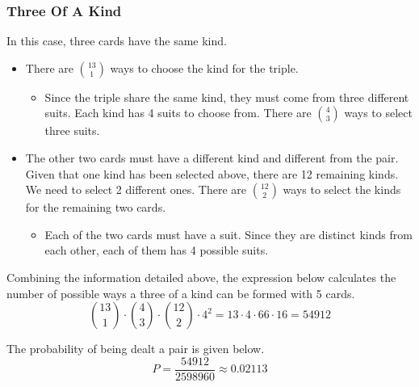 \subsubsection*{Three Of A Kind}
In this case, three cards have the same kind.
\begin{itemize}
    \item There are $\binom{13}{1}$ ways to choose the  kind for the triple.
    \begin{itemize}
        \item Since the triple share the same kind, they must come from three different suits.  Each kind has 4 suits to choose from. There are $\binom{4}{3}$ ways to select three suits.
    \end{itemize}
    \item The other  two cards must have a different kind and different from the pair.  Given that one kind has been selected above, there are 12 remaining kinds.  We need to select 2 different ones.  There are $\binom{12}{2}$ ways to select the kinds for the remaining two cards.
    \begin{itemize}
        \item Each of the two cards must have a suit.  Since they are distinct kinds from each other, each of them has 4 possible suits. 
    \end{itemize}    
\end{itemize}
Combining the information detailed above, the expression below calculates the number of possible ways a three of a kind can be formed with 5 cards.
$$\binom{13}{1} \cdot \binom{4}{3} \cdot \binom{12}{2} \cdot 4^2 = 13 \cdot 4 \cdot 66 \cdot 16 = 54912$$

The probability of being dealt a pair is given below.
$$P = \frac{54912}{2598960} \approx 0.02113$$

